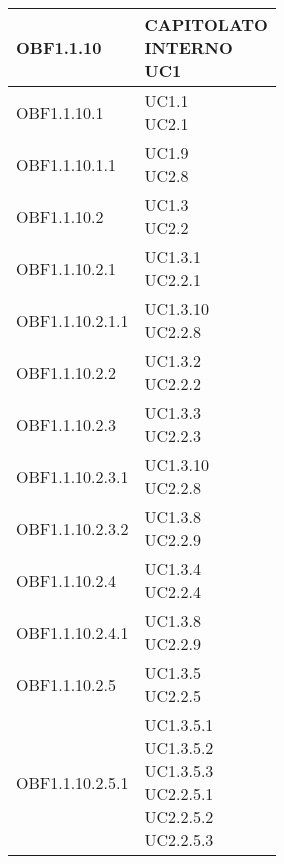 \documentclass{scalatekids-article}
\begin{document}
\begin{longtable}[H]{|p{5.5cm}|p{5.5cm}|}
  \hline
  OBF1.1.10 & \multiLineCell[t]{CAPITOLATO\\INTERNO\\UC1\\}\\
  \hline
  OBF1.1.10.1 & \multiLineCell[t]{UC1.1\\UC2.1\\}\\
  \hline
  OBF1.1.10.1.1 & \multiLineCell[t]{UC1.9\\UC2.8\\}\\
  \hline
  OBF1.1.10.2 & \multiLineCell[t]{UC1.3\\UC2.2\\}\\
  \hline
  OBF1.1.10.2.1 & \multiLineCell[t]{UC1.3.1\\UC2.2.1\\}\\
  \hline
  OBF1.1.10.2.1.1 & \multiLineCell[t]{UC1.3.10\\UC2.2.8\\}\\
  \hline
  OBF1.1.10.2.2 & \multiLineCell[t]{UC1.3.2\\UC2.2.2\\}\\
  \hline
  OBF1.1.10.2.3 & \multiLineCell[t]{UC1.3.3\\UC2.2.3\\}\\
  \hline
  OBF1.1.10.2.3.1 & \multiLineCell[t]{UC1.3.10\\UC2.2.8\\}\\
  \hline
  OBF1.1.10.2.3.2 & \multiLineCell[t]{UC1.3.8\\UC2.2.9\\}\\
  \hline
  OBF1.1.10.2.4 & \multiLineCell[t]{UC1.3.4\\UC2.2.4\\}\\
  \hline
  OBF1.1.10.2.4.1 & \multiLineCell[t]{UC1.3.8\\UC2.2.9\\}\\
  \hline
  OBF1.1.10.2.5 & \multiLineCell[t]{UC1.3.5\\UC2.2.5\\}\\
  \hline
  OBF1.1.10.2.5.1 & \multiLineCell[t]{UC1.3.5.1\\UC1.3.5.2\\UC1.3.5.3\\UC2.2.5.1\\UC2.2.5.2\\UC2.2.5.3\\}\\

\end{longtable}
\end{document}
